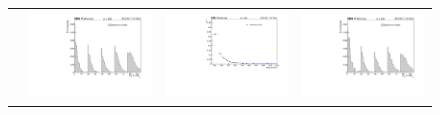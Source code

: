 \begin{figure}[htp]
\begin{tabular}{cccc}
& \hspace{-0.95cm} \includegraphics[scale=0.20]{fig/chapt6/qcd/qcd_mu_ch/ttbar_m_cos_finalTemp_muCh.pdf}
& \hspace{-0.95cm} \includegraphics[scale=0.22]{fig/chapt6/qcd/qcd_e_ch/ttbar_m_data_drivenQCD.pdf}
& \hspace{-0.95cm} \includegraphics[scale=0.20]{fig/chapt6/qcd/qcd_e_ch/ttbar_m_cos_finalTemp_eCh.pdf}\\

\end{tabular}
\end{figure}
